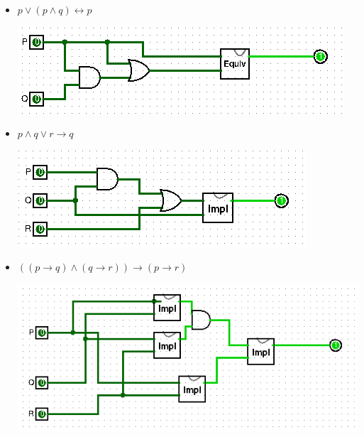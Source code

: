 \documentclass[answers]{exam}
\begin{document}
\begin{questions}
\begin{solution}
\begin{itemize}
\begin{center}
            \end{center}
      \item $p \lor (p \land q) \leftrightarrow p$
            \begin{center}
              \includegraphics[scale=0.9]{ejercicio1.2}
            \end{center}
      \item $p \land q \lor r \to q$
            \begin{center}
              \includegraphics[scale=0.9]{ejercicio1.3}
            \end{center}
      \item $((p \to q) \land (q \to r)) \to (p \to r)$
            \begin{center}
              \includegraphics[scale=0.9]{ejercicio1.4}
            \end{center}
    \end{itemize}
  \end{solution}


\end{questions}
\end{document}
